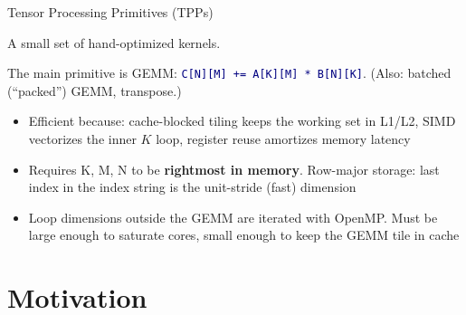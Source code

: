 \documentclass[aspectratio=169,10pt]{beamer}
\newcommand{\code}[1]{{\small\texttt{\colorbox{CodeBg}{\textcolor{Navy}{#1}}}}}
\begin{document}
%

\begin{frame}{Tensor Processing Primitives (TPPs)}

A small set of hand-optimized kernels.

The main primitive is GEMM: 
\code{C[N][M] += A[K][M] * B[N][K]}.
(Also: batched (``packed'') GEMM,  transpose.)

\medskip
\begin{itemize}
  \item Efficient because: cache-blocked tiling keeps the working set in L1/L2,
        SIMD vectorizes the inner $K$ loop, register reuse amortizes memory latency
  \item Requires K, M, N to be \textbf{rightmost in memory}.
        Row-major storage: last index in the index string is the unit-stride (fast) dimension
  \item Loop dimensions outside the GEMM are iterated with OpenMP.
        Must be large enough to saturate cores, small enough to keep the GEMM tile in cache
\end{itemize}
\end{frame}

\section{Motivation}
\end{document}
